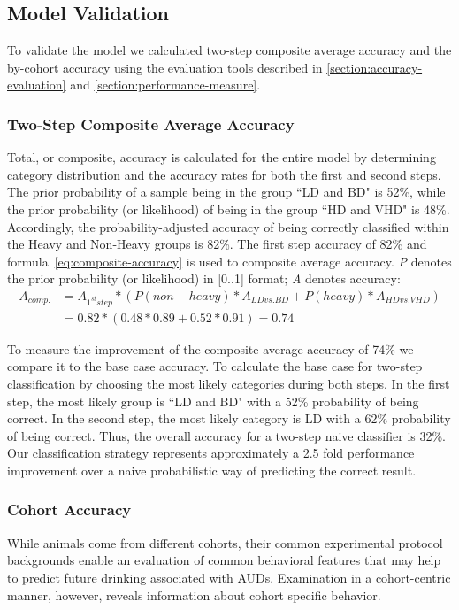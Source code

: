 	\subsection{Model Validation}
	To validate the model we calculated two-step composite average accuracy and the by-cohort accuracy using the evaluation tools described in \cref{section:accuracy-evaluation} and \cref{section:performance-measure}.
	
	\subsubsection{Two-Step Composite Average Accuracy} Total, or composite, accuracy is calculated for the entire model by determining category distribution and the accuracy rates for both the first and second steps. The prior probability of a sample being in the group ``LD and BD" is 52\%, while the prior probability (or likelihood) of being in the group ``HD and VHD" is 48\%. Accordingly, the probability-adjusted accuracy of being correctly classified within the Heavy and Non-Heavy groups is 82\%. The first step accuracy of 82\% and formula~\ref{eq:composite-accuracy} is used to composite average accuracy. \textit{P} denotes the prior probability (or likelihood) in [0..1] format; \textit{A} denotes accuracy: 
	\begin{equation}
	\begin{split}
	A_{comp.} &= A_{1^{st}step}*(P(non-heavy)*A_{LD vs. BD} + P(heavy)*A_{HD vs. VHD})\\
			&= 0.82*(0.48 * 0.89 + 0.52*0.91) = 0.74
	\end{split}
	\label{eq:composite-accuracy}
	\end{equation}
	
	To measure the improvement of the composite average accuracy of 74\% we compare it to the base case accuracy. To calculate the base case for two-step classification by choosing the most likely categories during both steps. In the first step, the most likely group is ``LD and BD" with a 52\% probability of being correct. In the second step, the most likely category is LD with a 62\% probability of being correct. Thus, the overall accuracy for a two-step naive classifier is 32\%. Our classification strategy represents approximately a 2.5 fold performance improvement over a naive probabilistic way of predicting the correct result. 
	
	
	\subsubsection{Cohort Accuracy} While animals come from different cohorts, their common experimental protocol backgrounds enable an evaluation of common behavioral features that may help to predict future drinking associated with AUDs. Examination in a cohort-centric manner, however, reveals information about cohort specific behavior. 
	
